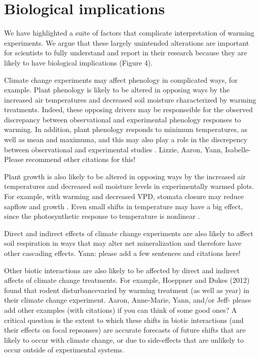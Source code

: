 \documentclass{article}
\begin{document}
\section* {Biological implications}
\par We have highlighted a suite of factors that complicate   interpretation of warming experiments. We argue that these largely unintended alterations are important for scientists to fully understand and report in their research because they are likely to have biological implications (Figure 4).
\par Climate change experiments may affect phenology in complicated ways, for example. Plant phenology is likely to be altered in opposing ways by the increased air temperatures and decreased soil moisture characterized by warming treatments. Indeed, these opposing drivers may be responseible for the observed discrepancy between observational and experimental phenology responses to warming\citep{wolkovich2012}. In addition, plant phenology responds to minimum temperatures, as well as mean and maximuma, and this may also play a role in the discrepency between observational and experimental studies \citep{shen2016,matthews2016}. Lizzie, Aaron, Yann, Isabelle-Please recommend other citations for this!
\par Plant growth is also likely to be altered in opposing ways by the increased air temperatures and decreased soil moisture levels in experimentally warmed plots. For example, with warming and decreased VPD, stomata closure may reduce sapflow and growth \citep{templer2016}. Even small shifts in temperature may have a big effect, since the photosynthetic response to temperature is nonlinear \citep{berry1980}.
\par Direct and indirect effects of climate change experiments are also likely to affect soil respiration in ways that may alter net mineralization and therefore have other cascading effects. Yann: please add a few sentences and citations here!

\par Other biotic interactions are also likely to be affected by direct and indirect affects of climate change treatments. For example, Hoeppner and Dukes  (2012) found that rodent disturbancevaried by warming treatment (as well as year) in their climate change experiment. Aaron, Anne-Marie, Yann, and/or Jeff- please add other examples (with citations) if you can think of some good ones? A critical question is the extent to which these shifts in biotic interactions (and their effects on focal repsonses) are accurate forecasts of future shifts that are likely to occur with climate change, or due to side-effects that are unlikely to occur outside of experimental systems.
\end{document}
